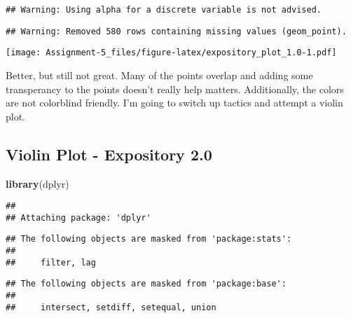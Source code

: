 \documentclass[
]{article}
\newenvironment{Shaded}{\begin{snugshade}}{\end{snugshade}}
\newcommand{\KeywordTok}[1]{\textcolor[rgb]{0.13,0.29,0.53}{\textbf{#1}}}
\newcommand{\NormalTok}[1]{#1}
\begin{document}
\begin{verbatim}
## Warning: Using alpha for a discrete variable is not advised.
\end{verbatim}

\begin{verbatim}
## Warning: Removed 580 rows containing missing values (geom_point).
\end{verbatim}

\texttt{[image: Assignment-5\_files/figure-latex/expository\_plot\_1.0-1.pdf]}

Better, but still not great. Many of the points overlap and adding some
transperancy to the points doesn't really help matters. Additionally,
the colors are not colorblind friendly. I'm going to switch up tactics
and attempt a violin plot.

\hypertarget{violin-plot---expository-2.0}{%
\subsection{Violin Plot - Expository
2.0}\label{violin-plot---expository-2.0}}

\begin{Shaded}
\begin{Highlighting}[]
\KeywordTok{library}\NormalTok{(dplyr)}
\end{Highlighting}
\end{Shaded}

\begin{verbatim}
## 
## Attaching package: 'dplyr'
\end{verbatim}

\begin{verbatim}
## The following objects are masked from 'package:stats':
## 
##     filter, lag
\end{verbatim}

\begin{verbatim}
## The following objects are masked from 'package:base':
## 
##     intersect, setdiff, setequal, union
\end{verbatim}
\end{document}
